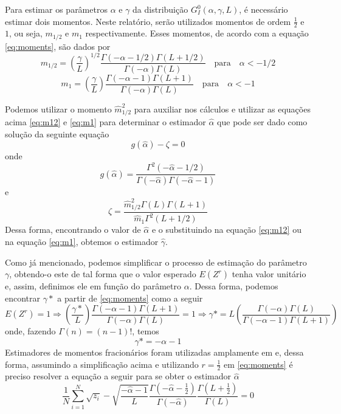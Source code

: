 \documentclass[12pt]{article}
\begin{document}
Para estimar os parâmetros $\alpha$ e $\gamma$ da distribuição $G_I^0(\alpha, \gamma, L)$, é necessário estimar dois momentos. Neste relatório, serão utilizados momentos de ordem $\frac{1}{2}$ e $1$, ou seja, $m_{1/2}$ e $m_1$ respectivamente. Esses momentos, de acordo com a equação \eqref{eq:moments}, são dados por
\begin{equation}
    m_{1/2} = \left ( \frac{\gamma}{L}\right )^{1/2} \frac{\Gamma(-\alpha-1/2)\Gamma(L+1/2)}{\Gamma(-\alpha)\Gamma(L)} \quad \text{para} \quad \alpha < -1/2 \label{eq:m12}
\end{equation}
\begin{equation}
    m_{1} = \left ( \frac{\gamma}{L}\right ) \frac{\Gamma(-\alpha-1)\Gamma(L+1)}{\Gamma(-\alpha)\Gamma(L)} \quad \text{para} \quad \alpha < -1 \label{eq:m1}
\end{equation}

Podemos utilizar o momento $\widehat{m}_{1/2}^2$ para auxiliar nos cálculos e utilizar as equações acima \eqref{eq:m12} e \eqref{eq:m1} para determinar o estimador $\widehat{\alpha}$ que pode ser dado como solução da seguinte equação
\begin{equation}
    g(\widehat{\alpha}) - \zeta = 0
\end{equation}
onde 
\begin{equation}
    g(\widehat{\alpha}) = \frac{\Gamma^2(-\widehat{\alpha} - 1/2)}{\Gamma(-\widehat{\alpha})\Gamma(-\widehat{\alpha} - 1)}
\end{equation}
e
\begin{equation}
    \zeta = \frac{\widehat{m}_{1/2}^2\Gamma(L)\Gamma(L+1)}{\widehat{m}_{1}\Gamma^2(L+1/2)}
\end{equation}
Dessa forma, encontrando o valor de $\widehat{\alpha}$ e o substituindo na equação \eqref{eq:m12} ou na equação \eqref{eq:m1}, obtemos o estimador $\widehat{\gamma}$.

Como já mencionado, podemos simplificar o processo de estimação do parâmetro $\gamma$, obtendo-o este de tal forma que o valor esperado $E(Z^r)$ tenha valor unitário e, assim, definimos ele em função do parâmetro $\alpha$. Dessa forma, podemos encontrar $\gamma*$ a partir de \eqref{eq:moments} como a seguir
\begin{equation}
    E(Z^r) = 1 \Rightarrow \left (\frac{\gamma*}{L}\right ) \frac{\Gamma(-\alpha-1)\Gamma(L+1)}{\Gamma(-\alpha)\Gamma(L)} = 1 \Rightarrow \gamma* = L\left ( \frac{\Gamma(-\alpha)\Gamma(L)}{\Gamma(-\alpha-1)\Gamma(L+1)} \right ) 
\end{equation}
onde, fazendo $\Gamma(n) = (n-1)!$, temos
\begin{equation}
    \gamma* = -\alpha - 1
\end{equation}
Estimadores de momentos fracionários foram utilizadas amplamente em \citet{Clutter1997} e, dessa forma, assumindo a simplificação acima e utilizando $r=\frac{1}{2}$  em \eqref{eq:moments} é preciso resolver a equação a seguir para se obter o estimador $\widehat{\alpha}$
\begin{equation}
    \frac{1}{N}\sum_{i=1}^{N}\sqrt{z_i}-\sqrt{\frac{-\widehat{\alpha} - 1}{L}}\frac{\Gamma(-\widehat{\alpha} - \frac{1}{2})}{\Gamma(-\widehat{\alpha})}\frac{\Gamma(L+\frac{1}{2})}{\Gamma(L)} = 0
\end{equation}
\end{document}
